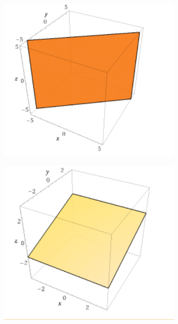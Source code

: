 \begin{solution}
\begin{figure}[htbp]
\begin{subfigure}{0.23\textwidth}
        \includegraphics[width=\linewidth]{figure/1-4.png}
      \end{subfigure} \hfill
      \begin{subfigure}{0.23\textwidth}
        \centering
        \includegraphics[width=\linewidth]{figure/1-5.png}
      \end{subfigure} \hfill
      \begin{subfigure}{0.23\textwidth}

\end{subfigure}
\end{figure}
\end{solution}
